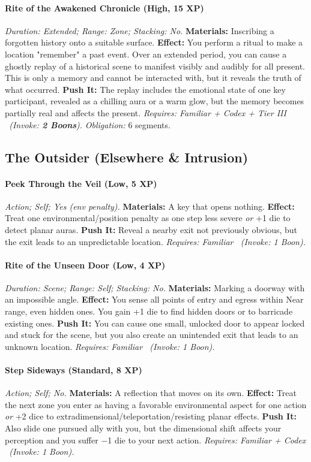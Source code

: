 \paragraph{Rite of the Awakened Chronicle (High, 15 XP)} \emph{Duration: Extended; Range: Zone; Stacking: No.}
\textbf{Materials:} Inscribing a forgotten history onto a suitable surface.
\textbf{Effect:} You perform a ritual to make a location "remember" a past event. Over an extended period, you can cause a ghostly replay of a historical scene to manifest visibly and audibly for all present. This is only a memory and cannot be interacted with, but it reveals the truth of what occurred.
\textbf{Push It:} The replay includes the emotional state of one key participant, revealed as a chilling aura or a warm glow, but the memory becomes partially real and affects the present.
\emph{Requires: Familiar + Codex + Tier III \ (\textit{Invoke:} \textbf{2 Boons}).}
\emph{Obligation:} 6 segments.

\subsection{The Outsider (Elsewhere \& Intrusion)}
\paragraph{Peek Through the Veil (Low, 5 XP)} \emph{Action; Self; Yes (env penalty).}
\textbf{Materials:} A key that opens nothing.
\textbf{Effect:} Treat one environmental/position penalty as one step less severe \emph{or} +1 die to detect planar auras.
\textbf{Push It:} Reveal a nearby exit not previously obvious, but the exit leads to an unpredictable location.
\emph{Requires: Familiar \ (\textit{Invoke:} 1 Boon).}
\paragraph{Rite of the Unseen Door (Low, 4 XP)} \emph{Duration: Scene; Range: Self; Stacking: No.}
\textbf{Materials:} Marking a doorway with an impossible angle.
\textbf{Effect:} You sense all points of entry and egress within Near range, even hidden ones. You gain +1 die to find hidden doors or to barricade existing ones.
\textbf{Push It:} You can cause one small, unlocked door to appear locked and stuck for the scene, but you also create an unintended exit that leads to an unknown location.
\emph{Requires: Familiar \ (\textit{Invoke:} 1 Boon).}
\paragraph{Step Sideways (Standard, 8 XP)} \emph{Action; Self; No.}
\textbf{Materials:} A reflection that moves on its own.
\textbf{Effect:} Treat the next zone you enter as having a favorable environmental aspect for one action \emph{or} +2 dice to extradimensional/teleportation/resisting planar effects.
\textbf{Push It:} Also slide one pursued ally with you, but the dimensional shift affects your perception and you suffer −1 die to your next action.
\emph{Requires: Familiar + Codex \ (\textit{Invoke:} 1 Boon).}

